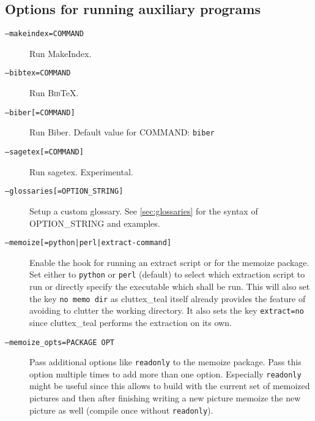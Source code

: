 \documentclass[a4paper]{report}
\providecommand\BibTeX{\textsc{Bib}\TeX}
\newcommand\metavar[1]{\textnormal{\textsf{#1}}}
\begin{document}
\subsection{Options for running auxiliary programs}
\begin{description}
\item[\texttt{--makeindex=\metavar{COMMAND}}]
  Run MakeIndex.
\item[\texttt{--bibtex=\metavar{COMMAND}}]
  Run \BibTeX.
\item[\texttt{--biber[=\metavar{COMMAND}]}]
  Run Biber. Default value for \metavar{COMMAND}: \texttt{biber}
\item[\texttt{--sagetex[=\metavar{COMMAND}]}]
  Run sagetex. Experimental.
\item[\texttt{--glossaries[=\metavar{OPTION\_STRING}]}]
  Setup a custom glossary. See \autoref{sec:glossaries} for the syntax of \metavar{OPTION\_STRING} and examples.
\item[\texttt{--memoize[=\metavar{python|perl|extract-command}]}]
  Enable the hook for running an extract script or for the memoize package. Set
  either to \texttt{python} or \texttt{perl} (default) to select which
  extraction script to run or directly specify the executable which shall be
  run. This will also set the key \texttt{no memo dir} as cluttex\_teal itself
  already provides the feature of avoiding to clutter the working directory. It
  also sets the key \texttt{extract=no} since cluttex\_teal performs the
  extraction on its own.
\item[\texttt{--memoize\_opts=\metavar{PACKAGE OPT}}]
  Pass additional options like \texttt{readonly} to the memoize package. Pass
  this option multiple times to add more than one option.
  Especially \texttt{readonly} might be useful since this allows to build with
  the current set of memoized pictures and then after finishing writing a new
  picture memoize the new picture as well (compile once without
  \texttt{readonly}).
\end{description}
\end{document}
